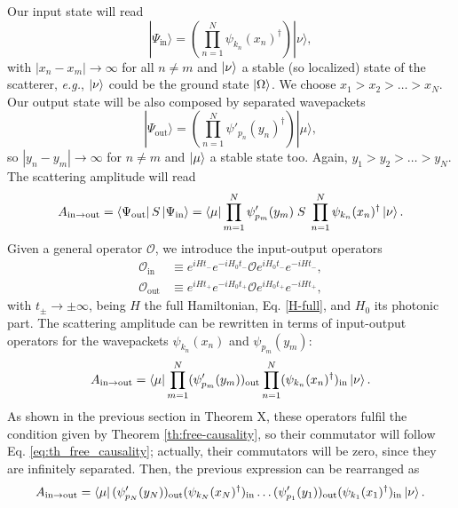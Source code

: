 \documentclass[notitlepage, prx, preprint, amsmath,superscriptaddress,amssymb]{revtex4-1}
\begin{document}
Our input state will read
\begin{equation}
|\Psi_\text{in}\rangle = \left(\prod_{n=1}^N \psi_{k_n}(x_n)^\dagger \right)|\nu\rangle,
\end{equation}
with $|x_n-x_m|\to\infty$ for all $n\neq m$ and $\ket{\nu}$ a stable (so localized) state of the scatterer, \emph{e.g.}, $\ket{\nu}$ could be the ground state $\ket{\Omega}$. We choose $x_1>x_2>\dots >x_N$. Our output state will be also composed by separated wavepackets
\begin{equation}
|\Psi_\text{out}\rangle = \left(\prod_{n=1}^N \psi'_{p_n}(y_n)^\dagger \right)|\mu\rangle,
\end{equation}
so $|y_n-y_m|\to\infty$ for $n\neq m$ and $\ket{\mu}$ a stable state too. Again, $y_1>y_2>\dots > y_N$. The scattering amplitude will read
\begin{equation}
A_{\text{in}\to\text{out}}=\bra{\Psi_\text{out}}S\ket{\Psi_\text{in}}= \bra{\mu} \prod_{m=1}^N \psi'_{p_m}(y_m)\;S\;\prod_{n=1}^N\psi_{k_n}(x_n)^\dagger\ket{\nu}.
\end{equation}
Given a general operator $\mathcal{O}$, we introduce the input-output operators
\begin{align}
\label{eq:O_in}\mathcal{O}_\text{in} & \equiv e^{iHt_-}e^{-iH_0t_-} \mathcal{O}e^{iH_0t_-}e^{-iHt_-},\\
\label{eq:O_out}\mathcal{O}_\text{out} & \equiv e^{iHt_+}e^{-iH_0t_+} \mathcal{O}e^{iH_0t_+}e^{-iHt_+},
\end{align}
with $t_\pm \to \pm \infty$, being $H$ the full Hamiltonian, Eq. \eqref{H-full}, and $H_0$ its photonic part. The scattering amplitude can be rewritten in terms of input-output operators for the wavepackets $\psi_{k_n}(x_n)$ and $\psi_{p_m}(y_m)$:
\begin{equation}
A_{\text{in}\to\text{out}}=\bra{\mu} \prod_{m=1}^N (\psi'_{p_m}(y_m))_\text{out}\prod_{n=1}^N(\psi_{k_n}(x_n)^\dagger)_\text{in}\ket{\nu}.
\end{equation}
{\color{red}As shown in the previous section in Theorem X}, these operators fulfil the condition given by Theorem \ref{th:free-causality}, so their commutator will follow Eq. \eqref{eq:th_free_causality}; actually, their commutators will be zero, since they are infinitely separated. Then, the previous expression can be rearranged as
\begin{align}
A_{\text{in}\to\text{out}}  =
 \bra{\mu} 
( \psi^\prime_{p_N} (y_N)
 )_{\text{out}}
(\psi_{k_N}(x_N)^\dagger)_{\text{in}}
 \dots 
 ( 
\psi^\prime_{p_1} (y_1) 
 )
_{\text{out}}
(
\psi_{k_1}(x_1)^\dagger )_\text{in}\ket{\nu}.
\end{align}
\end{document}
